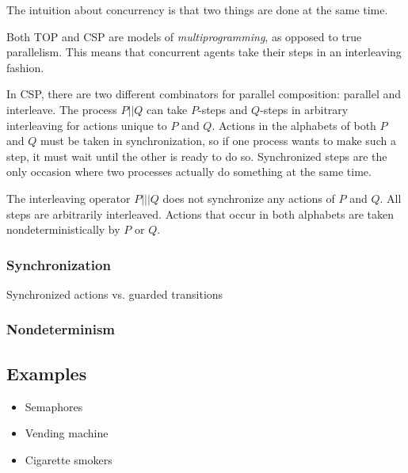 The intuition about concurrency is that two things are done at the same time.

Both TOP and CSP are models of \emph{multiprogramming}, as opposed to true parallelism.
This means that concurrent agents take their steps in an interleaving fashion.

In CSP, there are two different combinators for parallel composition: parallel and interleave.
The process $P || Q$ can take $P$-steps and $Q$-steps in arbitrary interleaving for actions unique to $P$ and $Q$.
Actions in the alphabets of both $P$ and $Q$ must be taken in synchronization, so if one process wants to make such a step, it must wait until the other is ready to do so.
Synchronized steps are the only occasion where two processes actually do something at the same time.

The interleaving operator $P ||| Q$ does not synchronize any actions of $P$ and $Q$.
All steps are arbitrarily interleaved.
Actions that occur in both alphabets are taken nondeterministically by $P$ or $Q$.

\subsubsection*{Synchronization}
Synchronized actions vs. guarded transitions

\subsubsection*{Nondeterminism}


\subsection{Examples}

\begin{itemize}
\item Semaphores
\item Vending machine
\item Cigarette smokers
\end{itemize}
